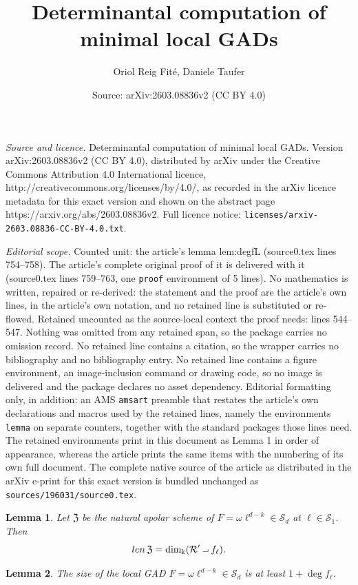 \documentclass[10pt,a4paper]{amsart}
\title{Determinantal computation of minimal local GADs}
\author{Oriol Reig Fit\'e, Daniele Taufer}
\date{Source: arXiv:2603.08836v2 (CC BY 4.0)}
\newtheorem{lemma}{Lemma}
\def\R{\mathcal{R}}
\renewcommand{\S}{\mathcal{S}}
\def\Z{\mathfrak{Z}}
\newcommand{\contract}{\mathbin{\mathpalette\dointprod\relax}}
\newcommand{\dointprod}[2]{%
  \raisebox{\depth}{\scalebox{1}[-1]{$#1\lnot$}}}
\renewcommand{\k}{\Bbbk}
\newcommand{\len}{\textnormal{len}\,}
\begin{document}
\maketitle

\noindent\emph{Source and licence.} Determinantal computation of minimal local GADs. Version arXiv:2603.08836v2 (CC BY 4.0), distributed by arXiv under the Creative Commons Attribution 4.0 International licence, http://creativecommons.org/licenses/by/4.0/, as recorded in the arXiv licence metadata for this exact version and shown on the abstract page https://arxiv.org/abs/2603.08836v2. Full licence notice: \texttt{licenses/arxiv-2603.08836-CC-BY-4.0.txt}.\par\smallskip

\noindent\textit{Editorial scope.} Counted unit: the article's lemma lem:degfL (source0.tex lines 754--758). The article's complete original proof of it is delivered with it (source0.tex lines 759--763, one \texttt{proof} environment of 5 lines). No mathematics is written, repaired or re-derived: the statement and the proof are the article's own lines, in the article's own notation, and no retained line is substituted or re-flowed.  Retained uncounted as the source-local context the proof needs: lines 544--547.  Nothing was omitted from any retained span, so the package carries no omission record.  No retained line contains a citation, so the wrapper carries no bibliography and no bibliography entry.  No retained line contains a figure environment, an image-inclusion command or drawing code, so no image is delivered and the package declares no asset dependency.  Editorial formatting only, in addition: an AMS \texttt{amsart} preamble that restates the article's own declarations and macros used by the retained lines, namely the environments \texttt{lemma} on separate counters, together with the standard packages those lines need.  The retained environments print in this document as Lemma 1 in order of appearance, whereas the article prints the same items with the numbering of its own full document.  The complete native source of the article as distributed in the arXiv e-print for this exact version is bundled unchanged as \texttt{sources/196031/source0.tex}.
\begin{lemma} \label{lemma:schemedim}
    Let $\Z$ be the natural apolar scheme of $F = \omega \ell^{d-k} \in \S_d$ at $\ell \in \S_1$. Then
    \[ \len \Z = \dim_{\k} (\R' \contract f_{\ell}). \]
\end{lemma}

\begin{lemma} \label{lem:degfL}
    The size of the local GAD $F = \omega\ell^{d-k} \in \S_d$ is at least $1+\deg f_{\ell}$.
\end{lemma}
\end{document}
